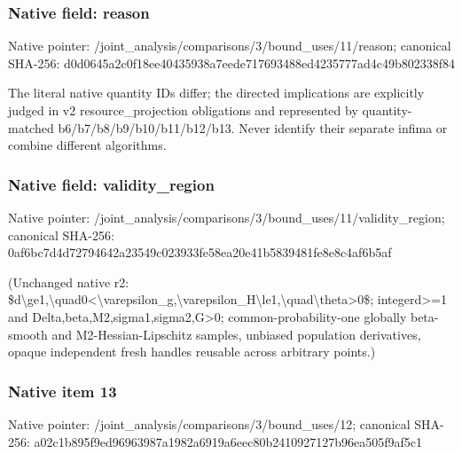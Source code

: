 \documentclass[10pt,a4paper]{article}
\begin{document}
\subsubsection{Native field: reason}
Native pointer: /joint\_\allowbreak{}analysis/comparisons/3/bound\_\allowbreak{}uses/11/reason; canonical SHA-256: d0d0645a2c0f18ee40435938a7eede717693488ed4235777ad4c49b802338f84

\begingroup\raggedright\sloppy The literal native quantity IDs differ;\allowbreak{} the directed implications are explicitly judged in v2 resource\_\allowbreak{}projection obligations and represented by quantity-matched b6/\allowbreak{}b7/\allowbreak{}b8/\allowbreak{}b9/\allowbreak{}b10/\allowbreak{}b11/\allowbreak{}b12/\allowbreak{}b13. Never identify their separate infima or combine different algorithms.\par\endgroup

\subsubsection{Native field: validity\_\allowbreak{}region}
Native pointer: /joint\_\allowbreak{}analysis/comparisons/3/bound\_\allowbreak{}uses/11/validity\_\allowbreak{}region; canonical SHA-256: 0af6bc7d4d72794642a23549c023933fe58ea20e41b5839481fe8e8c4af6b5af

\begingroup\raggedright\sloppy (Unchanged native r2:\allowbreak{} \$d\textbackslash{}ge1,\allowbreak{}\textbackslash{}quad0<\textbackslash{}varepsilon\_\allowbreak{}g,\allowbreak{}\textbackslash{}varepsilon\_\allowbreak{}H\textbackslash{}le1,\allowbreak{}\textbackslash{}quad\textbackslash{}theta>0\$;\allowbreak{} integerd>=\allowbreak{}1 and Delta,\allowbreak{}beta,\allowbreak{}M2,\allowbreak{}sigma1,\allowbreak{}sigma2,\allowbreak{}G>0;\allowbreak{} common-probability-one globally beta-smooth and M2-Hessian-Lipschitz samples,\allowbreak{} unbiased population derivatives,\allowbreak{} opaque independent fresh handles reusable across arbitrary points.)\par\endgroup

\subsubsection{Native item 13}
Native pointer: /joint\_\allowbreak{}analysis/comparisons/3/bound\_\allowbreak{}uses/12; canonical SHA-256: a02c1b895f9ed96963987a1982a6919a6eec80b2410927127b96ea505f9af5c1
\end{document}
